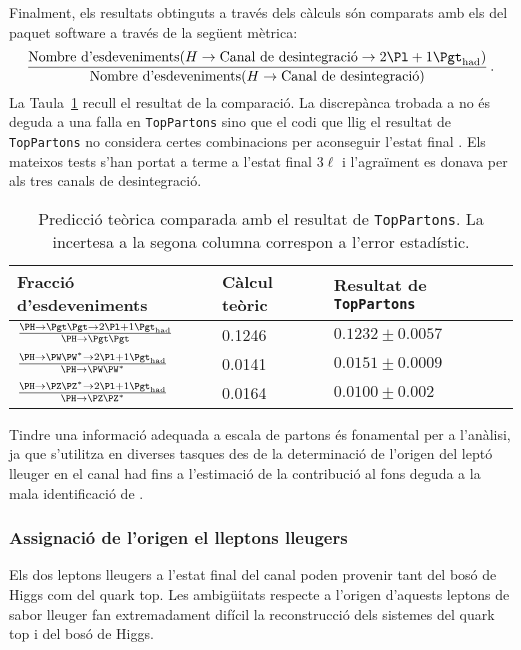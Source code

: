 Finalment, els resultats obtinguts a través dels càlculs són comparats amb els del paquet software a través de la següent mètrica:
\begin{equation*}
\frac{\text{Nombre d'esdeveniments}(H \rightarrow \text{Canal de desintegració} \rightarrow \dileptau)}{\text{Nombre d'esdeveniments}(H \rightarrow \text{Canal de desintegració)}}\, .
\end{equation*}
La Taula~\ref{tab:Resum:ChaptH:Prediction_VS_TopPartons} recull el resultat de la comparació. La discrepànca trobada
a \HZZ no és deguda a una falla en \texttt{TopPartons} sino que el codi que llig el resultat de \texttt{TopPartons} no considera
certes combinacions per aconseguir l'estat final \dileptau. Els mateixos tests s'han portat a terme a l'estat final $3\ell$ i l'agraïment
es donava per als tres canals de desintegració.

\begin{table}[]
\centering
\begin{tabular}{l|l|l}
\toprule
Fracció d'esdeveniments								&   Càlcul teòric   	& Resultat de \texttt{TopPartons} \\
\midrule
$\frac{\Htautau \rightarrow \dileptau }{\Htautau}$  	&   0.1246         	&  $0.1232  \pm 0.0057$ 	\\ 
$\frac{\HWW 	\rightarrow \dileptau}{\HWW}$       	&   0.0141        		&  $0.0151  \pm 0.0009$   \\ 
$\frac{\HZZ 	\rightarrow \dileptau }{\HZZ}$           	&   0.0164         	&  $0.0100  \pm 0.002$     \\ \bottomrule

\end{tabular}
\caption{Predicció teòrica comparada amb el resultat de \texttt{TopPartons}. La incertesa a la segona columna correspon
a l'error estadístic. }
\label{tab:Resum:ChaptH:Prediction_VS_TopPartons}
\end{table}


Tindre una informació adequada a escala de partons és fonamental per a l'anàlisi, ja que s'utilitza en diverses tasques
des de la determinació de l'origen del leptó lleuger en el canal \dilepSStau had fins a l'estimació de la contribució al fons 
deguda a la mala identificació de \tauhad.


\subsubsection{Assignació de l'origen el lleptons lleugers}
\label{chap:resumen_val:tHq:Senyal:origin}
Els dos leptons lleugers a l'estat final del canal \dileptau poden provenir tant del bosó de Higgs com del quark top.
Les ambigüitats respecte a l'origen d'aquests leptons de sabor lleuger fan extremadament difícil la reconstrucció dels
sistemes del quark top i del bosó de Higgs.

